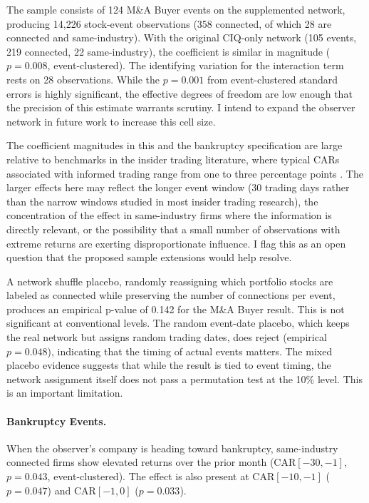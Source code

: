 The sample consists of 124 M\&A Buyer events on the supplemented network, producing 14,226 stock-event observations (358 connected, of which 28 are connected and same-industry). With the original CIQ-only network (105 events, 219 connected, 22 same-industry), the coefficient is similar in magnitude ($p=0.008$, event-clustered). The identifying variation for the interaction term rests on 28 observations. While the $p=0.001$ from event-clustered standard errors is highly significant, the effective degrees of freedom are low enough that the precision of this estimate warrants scrutiny. I intend to expand the observer network in future work to increase this cell size.

The coefficient magnitudes in this and the bankruptcy specification are large relative to benchmarks in the insider trading literature, where typical CARs associated with informed trading range from one to three percentage points \cite{ahern2017information}. The larger effects here may reflect the longer event window (30 trading days rather than the narrow windows studied in most insider trading research), the concentration of the effect in same-industry firms where the information is directly relevant, or the possibility that a small number of observations with extreme returns are exerting disproportionate influence. I flag this as an open question that the proposed sample extensions would help resolve.

A network shuffle placebo, randomly reassigning which portfolio stocks are labeled as connected while preserving the number of connections per event, produces an empirical p-value of 0.142 for the M\&A Buyer result. This is not significant at conventional levels. The random event-date placebo, which keeps the real network but assigns random trading dates, does reject (empirical $p=0.048$), indicating that the timing of actual events matters. The mixed placebo evidence suggests that while the result is tied to event timing, the network assignment itself does not pass a permutation test at the 10\% level. This is an important limitation.

\paragraph{Bankruptcy Events.} When the observer's company is heading toward bankruptcy, same-industry connected firms show elevated returns over the prior month (CAR$[-30,-1]$, $p=0.043$, event-clustered). The effect is also present at CAR$[-10,-1]$ ($p=0.047$) and CAR$[-1,0]$ ($p=0.033$).

